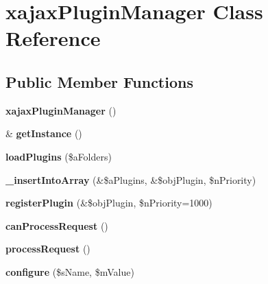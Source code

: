 \hypertarget{classxajaxPluginManager}{
\section{xajaxPluginManager Class Reference}
\label{classxajaxPluginManager}
}
\subsection*{Public Member Functions}
\begin{DoxyCompactItemize}
\item 
\hypertarget{classxajaxPluginManager_a8b077bd54176c8d0eab2cd07292afb5d}{
{\bfseries xajaxPluginManager} ()}
\label{classxajaxPluginManager_a8b077bd54176c8d0eab2cd07292afb5d}

\item 
\hypertarget{classxajaxPluginManager_a53f06633683fa64a446dd9c2d239724b}{
\& {\bfseries getInstance} ()}
\label{classxajaxPluginManager_a53f06633683fa64a446dd9c2d239724b}

\item 
\hypertarget{classxajaxPluginManager_ac1f01b54fa103af8a874c0e5ff5ac0c6}{
{\bfseries loadPlugins} (\$aFolders)}
\label{classxajaxPluginManager_ac1f01b54fa103af8a874c0e5ff5ac0c6}

\item 
\hypertarget{classxajaxPluginManager_adf4098b1518cb4c81141e4d528334914}{
{\bfseries \_\-insertIntoArray} (\&\$aPlugins, \&\$objPlugin, \$nPriority)}
\label{classxajaxPluginManager_adf4098b1518cb4c81141e4d528334914}

\item 
\hypertarget{classxajaxPluginManager_a060bc225cc9981974a4f23d4f36c583c}{
{\bfseries registerPlugin} (\&\$objPlugin, \$nPriority=1000)}
\label{classxajaxPluginManager_a060bc225cc9981974a4f23d4f36c583c}

\item 
\hypertarget{classxajaxPluginManager_adb778470b33299dbae2df6fe1ee22ba1}{
{\bfseries canProcessRequest} ()}
\label{classxajaxPluginManager_adb778470b33299dbae2df6fe1ee22ba1}

\item 
\hypertarget{classxajaxPluginManager_a8061cb880320dd92e845a074b655e76b}{
{\bfseries processRequest} ()}
\label{classxajaxPluginManager_a8061cb880320dd92e845a074b655e76b}

\item 
\hypertarget{classxajaxPluginManager_accabb163bee1faab512862fe488885bc}{
{\bfseries configure} (\$sName, \$mValue)}
\label{classxajaxPluginManager_accabb163bee1faab512862fe488885bc}


\end{DoxyCompactItemize}
